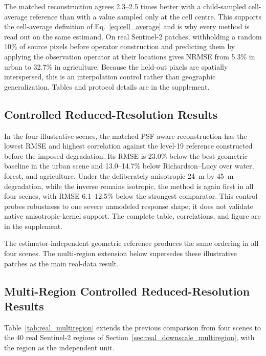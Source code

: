 \documentclass[journal]{IEEEtran}
\begin{document}
The matched reconstruction agrees 2.3--2.5 times better with a child-sampled
cell-average reference than with a value sampled only at the cell centre.
This supports the cell-average definition of Eq.~\eqref{eq:cell_average} and
is why every method is read out on the same estimand. On real Sentinel-2
patches, withholding a random 10\% of source pixels before operator
construction and predicting them by applying the observation operator at
their locations gives NRMSE from 5.3\% in urban to 32.7\% in agriculture.
Because the held-out pixels are spatially interspersed, this is an
interpolation control rather than geographic generalization. Tables and
protocol details are in the supplement.

\subsection{Controlled Reduced-Resolution Results}
\label{sec:real_downscale_results}

In the four illustrative scenes, the matched PSF-aware reconstruction has the
lowest RMSE and highest correlation against the level-19 reference constructed before the imposed degradation. Its RMSE is 23.0\% below the best geometric baseline in
the urban scene and 13.0--14.7\% below Richardson--Lucy over water, forest,
and agriculture. Under the deliberately anisotropic 24~m by 45~m degradation,
while the inverse remains isotropic, the method is again first in all four
scenes, with RMSE 6.1--12.5\% below the strongest comparator. This control
probes robustness to one severe unmodeled response shape; it does not
validate native anisotropic-kernel support. The complete table, correlations,
and figure are in the supplement.

The estimator-independent geometric reference produces the same ordering in
all four scenes. The multi-region extension below supersedes these
illustrative patches as the main real-data result.

\subsection{Multi-Region Controlled Reduced-Resolution Results}
\label{sec:real_downscale_multiregion_results}

Table~\ref{tab:real_multiregion} extends the previous comparison from four
scenes to the 40 real Sentinel-2 regions of
Section~\ref{sec:real_downscale_multiregion}, with the region as the
independent unit.
\end{document}
